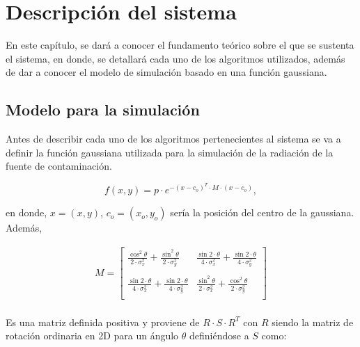 
\chapter{Descripción del sistema}
\label{ch:chapter2}

En este capítulo, se dará a conocer el fundamento teórico sobre el que se sustenta el sistema, en donde, se detallará cada uno de los algoritmos utilizados, además de dar a conocer el modelo de simulación basado en una función gaussiana.

\section{Modelo para la simulación} \label{Simulacion_Modelo}

Antes de describir cada uno de los algoritmos pertenecientes al sistema se va a definir la función gaussiana utilizada para la simulación de la radiación de la fuente de contaminación.

\begin{equation} \label{Funcion_Gaussiana} 
	f\left(x,y\right) = p\cdot{e}^{-\left(x-c_o\right)^{T}\cdot{M}\cdot\left(x-c_{o}\right)},
\end{equation}

en donde, $x=\left(x,y\right)$, $c_o=\left(x_{o},y_{o}\right)$ sería la posición del centro de la gaussiana. Además, 

\begin{equation}
	\begin{aligned}
	M= 	
	\begin{bmatrix}
		\frac{\cos^{2}{\theta}}{2\cdot{\sigma^{2}_{x}}}+ \frac{\sin^{2}{\theta}}{2\cdot{\sigma^{2}_{y}}} & \frac{\sin{2\cdot\theta}}{4\cdot{\sigma^{2}_{x}}}+ \frac{\sin{2\cdot\theta}}{4\cdot{\sigma^{2}_{y}}}\\\\
		
		\frac{\sin{2\cdot\theta}}{4\cdot{\sigma^{2}_{x}}}+ \frac{\sin{2\cdot\theta}}{4\cdot{\sigma^{2}_{y}}} & \frac{\sin^{2}{\theta}}{2\cdot{\sigma^{2}_{x}}}+ \frac{\cos^{2}{\theta}}{2\cdot{\sigma^{2}_{y}}}\\
	\end{bmatrix}
	\end{aligned}
\end{equation}
\\

Es una matriz definida positiva y proviene de $R\cdot{S}\cdot{R}^{T}$ con $R$ siendo la matriz de rotación ordinaria en 2D para un ángulo $\theta$ definiéndose a $S$ como:


